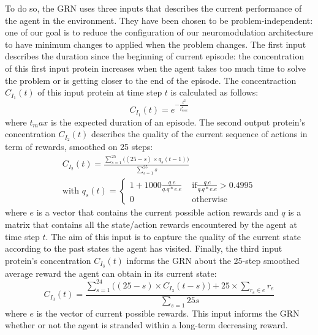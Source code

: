 To do so, the GRN uses three inputs that describes the current performance of the agent in the environment. They have been chosen to be problem-independent: one of our goal is to reduce the configuration of our neuromodulation architecture to have minimum changes to applied when the problem changes. The first input describes the duration since the beginning of current episode: the concentration of this first input protein increases when the agent takes too much time to solve the problem or is getting closer to the end of the episode. The concentraction $C_{I_1}(t)$ of this input protein at time step $t$ is calculated as follows:
\begin{equation}
C_{I_1}(t)=e^{-\frac{t^2}{t_{max}^2}}
\end{equation}
where $t_max$ is the expected duration of an episode. The second output protein's concentration $C_{I_2}(t)$ describes the quality of the current sequence of actions in term of rewards, smoothed on 25 steps:
\begin{eqnarray}
C_{I_2}(t)=\frac{\sum\limits_{s=1}^{25}{\Big((25-s)\times q_s(t-1)\Big)}}{\sum\limits_{s=1}^{25}s} \\
\text{with }q_s(t)=
\begin{cases}
1+1000\frac{q.e}{q.q*e.e} & \text{ if} \frac{q.e}{q.q*e.e}>0.4995\\
0 & \text{ otherwise}
\end{cases}\nonumber
\end{eqnarray}
where $e$ is a vector that contains the current possible action rewards and $q$ is a matrix that contains all the state/action rewards encountered by the agent at time step $t$. The aim of this input is to capture the quality of the current state according to the past states the agent has visited. Finally, the third input protein's concentration $C_{I_3}(t)$ informs the GRN about the 25-step smoothed average reward the agent can obtain in its current state:
\begin{equation}
C_{I_3}(t)=\frac{\sum\limits_{s=1}^{24}{\Big((25-s)\times C_{I_3}(t-s)\Big)}+25\times \sum\limits_{r_e\in e}{r_e}}{\sum\limits_{s=1}{25}s}
\end{equation}
where $e$ is the vector of current possible rewards. This input informs the GRN whether or not the agent is stranded within a long-term decreasing reward. 

